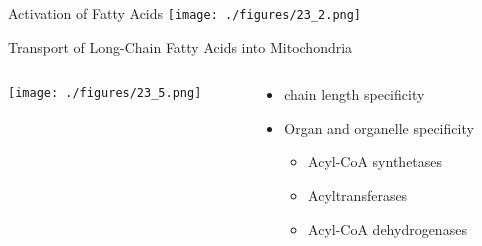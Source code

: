 \documentclass[presentation, smaller]{beamer}
\begin{document}
\begin{frame}[label={sec:orgheadline7}]{Activation of Fatty Acids}
\texttt{[image: ./figures/23\_2.png]}
\end{frame}

\begin{frame}[label={sec:orgheadline8}]{Transport of Long-Chain Fatty Acids into Mitochondria}
\begin{columns}
\begin{column}{0.6\columnwidth}
\centering
\texttt{[image: ./figures/23\_5.png]}
\end{column}

\begin{column}{0.4\columnwidth}
\begin{itemize}
\item chain length specificity
\item Organ and organelle specificity
\begin{itemize}
\item Acyl-CoA synthetases
\item Acyltransferases
\item Acyl-CoA dehydrogenases
\end{itemize}
\end{itemize}
\end{column}
\end{columns}
\end{frame}
\end{document}
